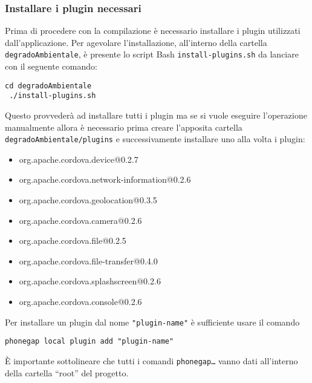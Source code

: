         \subsubsection{Installare i plugin necessari}
            Prima di procedere con la compilazione è necessario installare i 
            plugin utilizzati dall'applicazione. Per agevolare 
            l'installazione, all'interno della cartella\\
            \texttt{degradoAmbientale}, è presente lo script Bash 
            \texttt{install-plugins.sh} da lanciare con il seguente comando:
            \begin{lstlisting}[language=plane]
 cd degradoAmbientale
 ./install-plugins.sh
            \end{lstlisting}
            Questo provvederà ad installare tutti i plugin ma se si vuole 
            eseguire l'operazione manualmente allora è necessario prima creare 
            l'apposita cartella\\ \texttt{degradoAmbientale/plugins} e 
            successivamente installare uno alla volta i plugin:
            \begin{itemize}
                \item org.apache.cordova.device@0.2.7
                \item org.apache.cordova.network-information@0.2.6
                \item org.apache.cordova.geolocation@0.3.5
                \item org.apache.cordova.camera@0.2.6
                \item org.apache.cordova.file@0.2.5
                \item org.apache.cordova.file-transfer@0.4.0
                \item org.apache.cordova.splashscreen@0.2.6
                \item org.apache.cordova.console@0.2.6
            \end{itemize}
            Per installare un plugin dal nome \texttt{"plugin-name"} è 
            sufficiente usare il comando
            \begin{lstlisting}[language=plane]
 phonegap local plugin add "plugin-name"
            \end{lstlisting}
            
            È importante sottolineare che tutti i comandi
            \texttt{phonegap\ldots} vanno dati all'interno della cartella 
            ``root'' del progetto.
            
